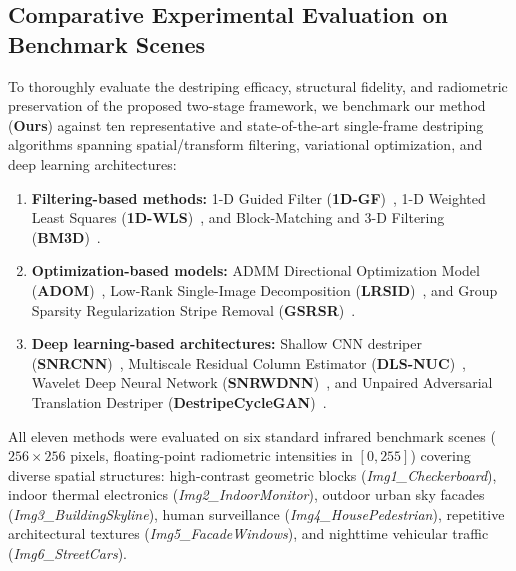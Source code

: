 
\subsection{Comparative Experimental Evaluation on Benchmark Scenes}
To thoroughly evaluate the destriping efficacy, structural fidelity, and radiometric preservation of the proposed two-stage framework, we benchmark our method (\textbf{Ours}) against ten representative and state-of-the-art single-frame destriping algorithms spanning spatial/transform filtering, variational optimization, and deep learning architectures:
\begin{enumerate}
    \item \textbf{Filtering-based methods:} 1-D Guided Filter (\textbf{1D-GF})~\cite{cao20161d}, 1-D Weighted Least Squares (\textbf{1D-WLS})~\cite{dong2018infrared}, and Block-Matching and 3-D Filtering (\textbf{BM3D})~\cite{dabov2007image}.
    \item \textbf{Optimization-based models:} ADMM Directional Optimization Model (\textbf{ADOM})~\cite{kim2023adom}, Low-Rank Single-Image Decomposition (\textbf{LRSID})~\cite{chang2016low}, and Group Sparsity Regularization Stripe Removal (\textbf{GSRSR})~\cite{chen2017infrared}.
    \item \textbf{Deep learning-based architectures:} Shallow CNN destriper (\textbf{SNRCNN})~\cite{kuai2017deep}, Multiscale Residual Column Estimator (\textbf{DLS-NUC})~\cite{he2019single}, Wavelet Deep Neural Network (\textbf{SNRWDNN})~\cite{guan2019wavelet}, and Unpaired Adversarial Translation Destriper (\textbf{DestripeCycleGAN})~\cite{xiao2020destripecyclegan}.
\end{enumerate}

All eleven methods were evaluated on six standard infrared benchmark scenes ($256 \times 256$ pixels, floating-point radiometric intensities in $[0, 255]$) covering diverse spatial structures: high-contrast geometric blocks (\textit{Img1\_Checkerboard}), indoor thermal electronics (\textit{Img2\_IndoorMonitor}), outdoor urban sky facades (\textit{Img3\_BuildingSkyline}), human surveillance (\textit{Img4\_HousePedestrian}), repetitive architectural textures (\textit{Img5\_FacadeWindows}), and nighttime vehicular traffic (\textit{Img6\_StreetCars}).


